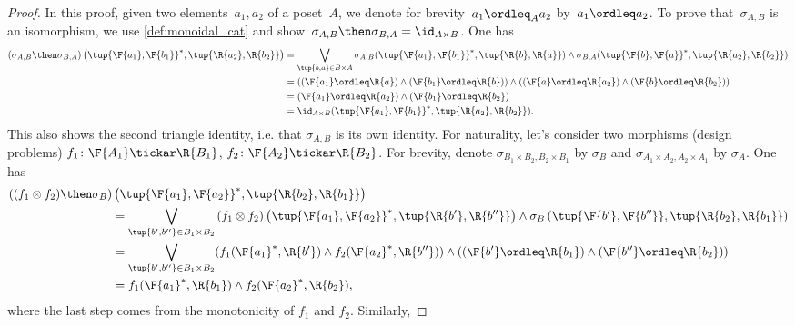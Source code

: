 \begin{proof}
In this proof, given two elements~$a_1,a_2$ of a poset~$A$, we denote for brevity~$a_1 \ordleq_A a_2$ by~$a_1 \ordleq a_2$.
To prove that~$\sigma_{A,B}$ is an isomorphism, we use \cref{def:monoidal_cat} and show~$\sigma_{A,B}\then \sigma_{B,A}=\id_{A\times B}$. One has
    \begin{equation}
        \begin{aligned}
           \left( \sigma_{A,B}\then \sigma_{B,A}\right) \left( \tup{\F{a_1},\F{b_1}}^*,\tup{\R{a_2},\R{b_2}}\right)&=\bigvee_{\tup{b,a}\in B\times A}\sigma_{A,B}(\tup{\F{a_1},\F{b_1}}^*,\tup{\R{b},\R{a}})\wedge \sigma_{B,A}(\tup{\F{b},\F{a}}^*,\tup{\R{a_2},\R{b_2}})\\
           &=\left( (\F{a_1}\ordleq \R{a}) \wedge (\F{b_1}\ordleq \R{b})\right)\wedge \left((\F{a}\ordleq \R{a_2}) \wedge (\F{b}\ordleq \R{b_2})\right)\\
           &=(\F{a_1}\ordleq \R{a_2})\wedge (\F{b_1}\ordleq \R{b_2})\\
           &=\id_{A\times B}(\tup{\F{a_1},\F{b_1}}^*,\tup{\R{a_2},\R{b_2}}).
        \end{aligned}
    \end{equation}
    This also shows the second triangle identity, i.e. that $\sigma_{A,B}$ is its own identity.
    For naturality, let's consider two morphisms (design problems) $f_1\colon \F{A_1}\tickar \R{B_1}$, $f_2\colon \F{A_2}\tickar \R{B_2}$. For brevity, denote $\sigma_{B_1\times B_2,B_2\times B_1}$ by $\sigma_B$ and $\sigma_{A_1\times A_2,A_2\times A_1}$ by $\sigma_A$. One has
    \begin{equation}
        \begin{aligned}
           \left((f_1\otimes f_2)\then \sigma_B \right)&\left( \tup{\F{a_1},\F{a_2}}^*,\tup{\R{b_2},\R{b_1}}\right)\\
           &=\bigvee_{\tup{b',b''}\in B_1\times B_2} \left(f_1\otimes f_2\right) \left( \tup{\F{a_1},\F{a_2}}^*,\tup{\R{b'},\R{b''}}\right)\wedge \sigma_B\left(\tup{\F{b'},\F{b''}},\tup{\R{b_2},\R{b_1}} \right)\\
           &=\bigvee_{\tup{b',b''}\in B_1\times B_2}(f_1(\F{a_1}^*,\R{b'})\wedge f_2(\F{a_2}^*,\R{b''}))\wedge (\left(\F{b'}\ordleq \R{b_1}\right) \wedge \left(\F{b''}\ordleq \R{b_2}\right))\\
           &= f_1(\F{a_1}^*,\R{b_1}) \wedge f_2(\F{a_2}^*,\R{b_2}),
        \end{aligned}
    \end{equation}
    where the last step comes from the monotonicity of $f_1$ and $f_2$. Similarly,

\end{proof}
